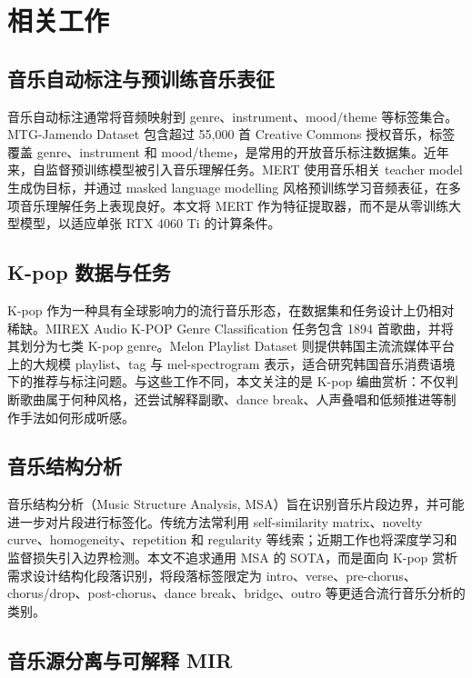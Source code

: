 \documentclass[UTF8,zihao=-4]{ctexart}
\begin{document}
\section{相关工作}

\subsection{音乐自动标注与预训练音乐表征}

音乐自动标注通常将音频映射到 genre、instrument、mood/theme 等标签集合。MTG-Jamendo Dataset 包含超过 55,000 首 Creative Commons 授权音乐，标签覆盖 genre、instrument 和 mood/theme，是常用的开放音乐标注数据集\cite{bogdanov2019mtgjamendo}。近年来，自监督预训练模型被引入音乐理解任务。MERT 使用音乐相关 teacher model 生成伪目标，并通过 masked language modelling 风格预训练学习音频表征，在多项音乐理解任务上表现良好\cite{mert2023}。本文将 MERT 作为特征提取器，而不是从零训练大型模型，以适应单张 RTX 4060 Ti 的计算条件。

\subsection{K-pop 数据与任务}

K-pop 作为一种具有全球影响力的流行音乐形态，在数据集和任务设计上仍相对稀缺。MIREX Audio K-POP Genre Classification 任务包含 1894 首歌曲，并将其划分为七类 K-pop genre\cite{mirex2020kpop}。Melon Playlist Dataset 则提供韩国主流流媒体平台上的大规模 playlist、tag 与 mel-spectrogram 表示，适合研究韩国音乐消费语境下的推荐与标注问题\cite{ferraro2021melon}。与这些工作不同，本文关注的是 K-pop 编曲赏析：不仅判断歌曲属于何种风格，还尝试解释副歌、dance break、人声叠唱和低频推进等制作手法如何形成听感。

\subsection{音乐结构分析}

音乐结构分析（Music Structure Analysis, MSA）旨在识别音乐片段边界，并可能进一步对片段进行标签化。传统方法常利用 self-similarity matrix、novelty curve、homogeneity、repetition 和 regularity 等线索；近期工作也将深度学习和监督损失引入边界检测\cite{nieto2020msa,peeters2023msa}。本文不追求通用 MSA 的 SOTA，而是面向 K-pop 赏析需求设计结构化段落识别，将段落标签限定为 intro、verse、pre-chorus、chorus/drop、post-chorus、dance break、bridge、outro 等更适合流行音乐分析的类别。

\subsection{音乐源分离与可解释 MIR}
\end{document}
